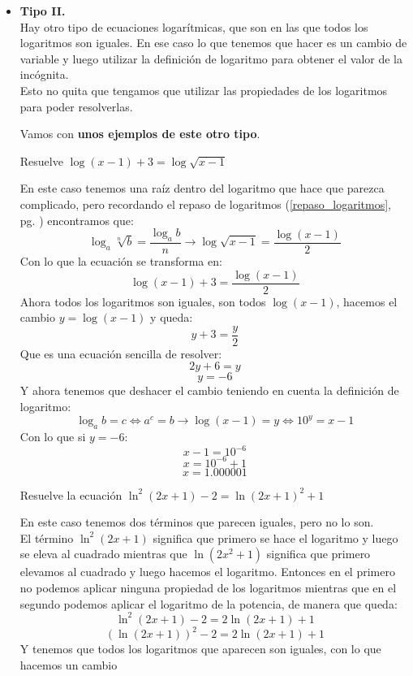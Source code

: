 \documentclass[a4paper,11pt,answers]{exam}
\begin{document}
\begin{itemize}
\item \large{\textbf{Tipo II.}}\\
  Hay otro tipo de ecuaciones logarítmicas, que son en las que todos los logaritmos son iguales.
  En ese caso lo que tenemos que hacer es un cambio de variable y luego utilizar la definición de
  logaritmo para obtener el valor de la incógnita.\\
  Esto no quita que tengamos que utilizar las propiedades de los logaritmos para poder resolverlas.

  Vamos con \textbf{unos ejemplos de este otro tipo}.
  \begin{questions}
  \question Resuelve $\log (x - 1) + 3 = \log \sqrt{x-1}$
    \begin{solution}
      En este caso tenemos una raíz dentro del logaritmo que hace que parezca complicado,
      pero recordando el repaso de logaritmos (\ref{repaso_logaritmos}, pg.
      \pageref{repaso_logaritmos}) encontramos que:
      \[\log_a \sqrt[n]{b} = \frac{\log_a b}{n} \longrightarrow \log \sqrt{x-1} =
        \frac{\log (x-1)}{2}\]
      Con lo que la ecuación se transforma en:
      \[\log ( x-1) + 3 = \frac{\log (x-1)}{2}\]
      Ahora todos los logaritmos son iguales, son todos $\log (x-1)$, hacemos el cambio
      $y = \log (x-1)$ y queda:
      \[y + 3 = \frac{y}{2}\]
      Que es una ecuación sencilla de resolver:
      \[2y + 6 = y\]
      \[y = -6\]
      Y ahora tenemos que deshacer el cambio teniendo en cuenta la definición de logaritmo:
      \[\log_a b = c \Leftrightarrow a^c = b \longrightarrow
        \log (x-1) = y \Leftrightarrow 10^y = x-1\]
      Con lo que si $y = -6$:
      \[x -1 = 10^{-6}\]
      \[x = 10^{-6} + 1\]
      \[x = 1.000001\]
    \end{solution}
  \question Resuelve la ecuación $\ln^2 (2x + 1) - 2 = \ln (2x + 1)^2 + 1$
    \begin{solution}
      En este caso tenemos dos términos que parecen iguales, pero no lo son.\\
      El término $\ln^2 (2x + 1)$ significa que primero se hace el logaritmo y luego se eleva
      al cuadrado mientras que $\ln (2x^2  + 1)$ significa que primero elevamos al cuadrado y
      luego hacemos el logaritmo. Entonces en el primero no podemos aplicar ninguna propiedad de
      los logaritmos mientras que en el segundo podemos aplicar el logaritmo de la potencia, de
      manera que queda:
      \[\ln^2 (2x + 1) - 2 = 2 \ln (2x + 1) + 1\]
      \[\left( \ln (2x + 1) \right)^2 - 2 = 2 \ln (2x + 1) + 1\]
      Y tenemos que todos los logaritmos que aparecen son iguales, con lo que hacemos un cambio

\end{solution}
\end{questions}
\end{itemize}
\end{document}
